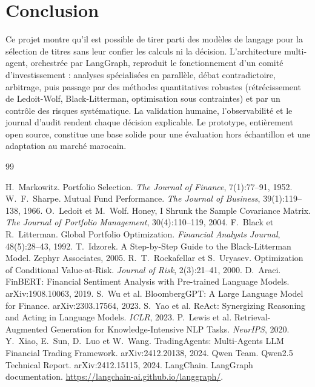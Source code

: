 \documentclass[11pt,a4paper]{report}
\begin{document}
\chapter*{Conclusion}
Ce projet montre qu'il est possible de tirer parti des modèles de langage pour la sélection de titres sans leur confier
les calculs ni la décision. L'architecture multi-agent, orchestrée par LangGraph, reproduit le fonctionnement d'un
comité d'investissement : analyses spécialisées en parallèle, débat contradictoire, arbitrage, puis passage par des
méthodes quantitatives robustes (rétrécissement de Ledoit-Wolf, Black-Litterman, optimisation sous contraintes) et par
un contrôle des risques systématique. La validation humaine, l'observabilité et le journal d'audit rendent chaque
décision explicable. Le prototype, entièrement open source, constitue une base solide pour une évaluation hors
échantillon et une adaptation au marché marocain.

\begin{thebibliography}{99}
 H.~Markowitz. Portfolio Selection. \emph{The Journal of Finance}, 7(1):77--91, 1952.
 W.~F.~Sharpe. Mutual Fund Performance. \emph{The Journal of Business}, 39(1):119--138, 1966.
 O.~Ledoit et M.~Wolf. Honey, I Shrunk the Sample Covariance Matrix. \emph{The Journal of Portfolio Management}, 30(4):110--119, 2004.
 F.~Black et R.~Litterman. Global Portfolio Optimization. \emph{Financial Analysts Journal}, 48(5):28--43, 1992.
 T.~Idzorek. A Step-by-Step Guide to the Black-Litterman Model. Zephyr Associates, 2005.
 R.~T.~Rockafellar et S.~Uryasev. Optimization of Conditional Value-at-Risk. \emph{Journal of Risk}, 2(3):21--41, 2000.
 D.~Araci. FinBERT: Financial Sentiment Analysis with Pre-trained Language Models. arXiv:1908.10063, 2019.
 S.~Wu et al. BloombergGPT: A Large Language Model for Finance. arXiv:2303.17564, 2023.
 S.~Yao et al. ReAct: Synergizing Reasoning and Acting in Language Models. \emph{ICLR}, 2023.
 P.~Lewis et al. Retrieval-Augmented Generation for Knowledge-Intensive NLP Tasks. \emph{NeurIPS}, 2020.
 Y.~Xiao, E.~Sun, D.~Luo et W.~Wang. TradingAgents: Multi-Agents LLM Financial Trading Framework. arXiv:2412.20138, 2024.
 Qwen Team. Qwen2.5 Technical Report. arXiv:2412.15115, 2024.
 LangChain. LangGraph documentation. \url{https://langchain-ai.github.io/langgraph/}.
\end{thebibliography}
\end{document}
